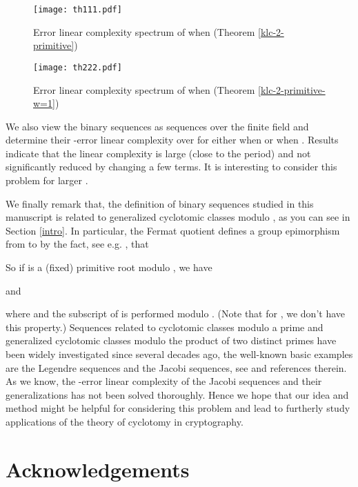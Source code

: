 \documentclass [11pt,a4paper]{article}
\begin{document}
\begin{figure}[H]
\centering
\texttt{[image: th111.pdf]}
\caption{Error linear complexity spectrum of  when  (Theorem \ref{klc-2-primitive})}
\end{figure}

\begin{figure}[H]
\centering
\texttt{[image: th222.pdf]}
\caption{Error linear complexity spectrum of  when  (Theorem \ref{klc-2-primitive-w=1})}
\end{figure}




We also view the binary sequences as sequences over the finite field 
and determine their -error linear complexity over  for either  when  or  when . Results indicate that the linear complexity is large (close to the period) and  not significantly reduced by changing a few terms. It is interesting to consider this problem for larger .





We finally remark that, the definition of binary sequences studied in this manuscript is related to
generalized cyclotomic classes modulo , as you can see in Section \ref{intro}. In particular, the Fermat quotient
  defines a group epimorphism from  to  by the fact, see e.g. \cite{OS}, that

So if  is a (fixed) primitive root modulo , we have

and

where   and the subscript of  is performed modulo . (Note that for , we don't have this property.) Sequences related to cyclotomic classes modulo a prime and generalized cyclotomic classes modulo the product of two
distinct primes have been widely investigated since several decades ago, the well-known basic examples are the Legendre sequences and the Jacobi sequences, see \cite{CDR,D97,D98,DHS} and references therein. As we know, the -error linear complexity of the Jacobi sequences and their generalizations \cite{D97,D98} has not been solved thoroughly.
Hence we hope that our idea and method might be helpful for considering this problem and lead to furtherly study applications of the theory of cyclotomy in cryptography.





\section*{Acknowledgements}
\end{document}
